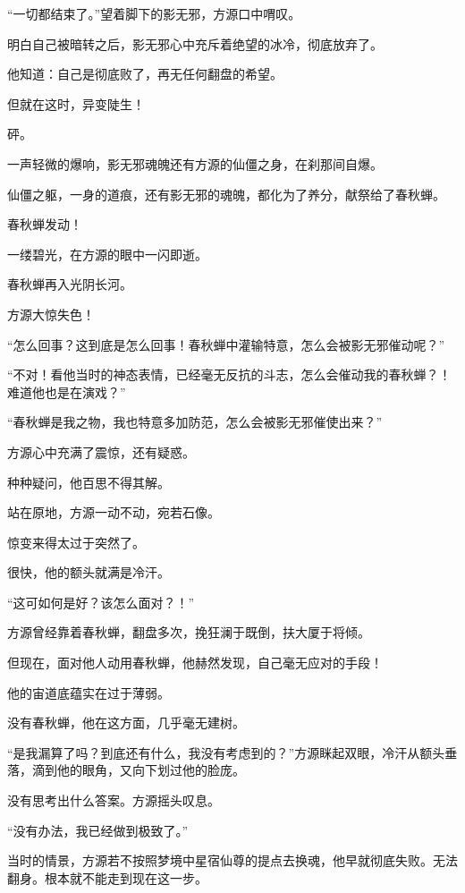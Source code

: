 
\begin{this_body}

“一切都结束了。”望着脚下的影无邪，方源口中喟叹。

明白自己被暗转之后，影无邪心中充斥着绝望的冰冷，彻底放弃了。

他知道：自己是彻底败了，再无任何翻盘的希望。

但就在这时，异变陡生！

砰。

一声轻微的爆响，影无邪魂魄还有方源的仙僵之身，在刹那间自爆。

仙僵之躯，一身的道痕，还有影无邪的魂魄，都化为了养分，献祭给了春秋蝉。

春秋蝉发动！

一缕碧光，在方源的眼中一闪即逝。

春秋蝉再入光阴长河。

方源大惊失色！

“怎么回事？这到底是怎么回事！春秋蝉中灌输特意，怎么会被影无邪催动呢？”

“不对！看他当时的神态表情，已经毫无反抗的斗志，怎么会催动我的春秋蝉？！难道他也是在演戏？”

“春秋蝉是我之物，我也特意多加防范，怎么会被影无邪催使出来？”

方源心中充满了震惊，还有疑惑。

种种疑问，他百思不得其解。

站在原地，方源一动不动，宛若石像。

惊变来得太过于突然了。

很快，他的额头就满是冷汗。

“这可如何是好？该怎么面对？！”

方源曾经靠着春秋蝉，翻盘多次，挽狂澜于既倒，扶大厦于将倾。

但现在，面对他人动用春秋蝉，他赫然发现，自己毫无应对的手段！

他的宙道底蕴实在过于薄弱。

没有春秋蝉，他在这方面，几乎毫无建树。

“是我漏算了吗？到底还有什么，我没有考虑到的？”方源眯起双眼，冷汗从额头垂落，滴到他的眼角，又向下划过他的脸庞。

没有思考出什么答案。方源摇头叹息。

“没有办法，我已经做到极致了。”

当时的情景，方源若不按照梦境中星宿仙尊的提点去换魂，他早就彻底失败。无法翻身。根本就不能走到现在这一步。


\end{this_body}
